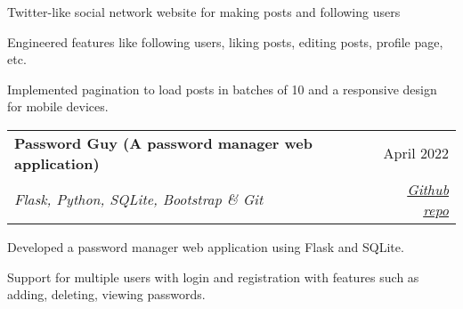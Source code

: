 \documentclass[a4paper,20pt]{article}
\makeatletter
\newcommand{\resumeSubheading}[4]{
  \vspace{-1pt}\item
    \begin{tabular*}{0.97\textwidth}{l@{\extracolsep{\fill}}r}
      \textbf{#1} & #2 \\
      \textit{#3} & \textit{#4} \\
    \end{tabular*}\vspace{-5pt}
}
\makeatother
\begin{document}

    \begin{description}[font=$\bullet$]
        \item {Twitter-like social network website for making posts and following users}
    \vspace{-3pt}
        \item {Engineered features like following users, liking posts, editing posts, profile page, etc.}
    \vspace{-3pt}
        \item {Implemented pagination to load posts in batches of 10 and a responsive design for mobile devices.}
    \end{description}
        
    \vspace{2pt}
    
    \resumeSubheading{Password Guy (A password manager web application)}{April 2022}
    {Flask, Python, SQLite, Bootstrap \& Git}{\href{https://github.com/satyamrs00/password_guy}{Github repo}}
    
    \begin{description}[font=$\bullet$]
        \item {Developed a password manager web application using Flask and SQLite.}
    \vspace{-3pt}
        \item {Support for multiple users with login and registration with features such as adding, deleting, viewing passwords.}
    \end{description}
    
\end{document}

